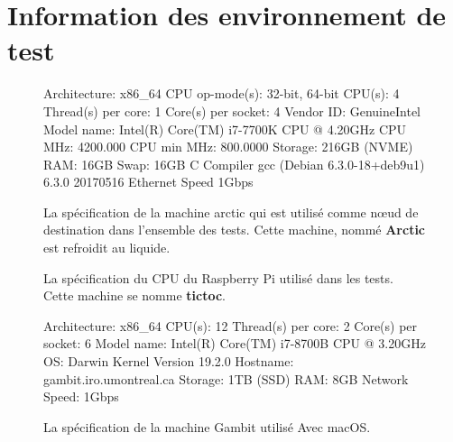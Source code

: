 \chapter{Information des environnement de test}
\label{ch:annexeA}

\begin{figure}[ht]
  \centering
\begin{mplisting}{1}
Architecture:          x86_64
CPU op-mode(s):        32-bit, 64-bit
CPU(s):                4
Thread(s) per core:    1
Core(s) per socket:    4
Vendor ID:             GenuineIntel
Model name:            Intel(R) Core(TM) i7-7700K CPU @ 4.20GHz
CPU MHz:               4200.000
CPU min MHz:           800.0000
Storage:               216GB (NVME)
RAM:                   16GB
Swap:                  16GB
C Compiler             gcc (Debian 6.3.0-18+deb9u1) 6.3.0 20170516
Ethernet Speed         1Gbps
\end{mplisting}
  \caption{La spécification de la machine arctic qui est utilisé comme nœud de destination dans
  l'ensemble des tests. Cette machine, nommé \textbf{Arctic} est refroidit au liquide.}
\end{figure}

\begin{figure}[h]
  \caption{La spécification du CPU du Raspberry Pi utilisé dans les tests.
  Cette machine se nomme \textbf{tictoc}.}
\end{figure}

\begin{figure}[h]
  \begin{mplisting}{1}
Architecture:        x86_64
CPU(s):              12
Thread(s) per core:  2
Core(s) per socket:  6
Model name:          Intel(R) Core(TM) i7-8700B CPU @ 3.20GHz
OS:                  Darwin Kernel Version 19.2.0
Hostname:            gambit.iro.umontreal.ca
Storage:             1TB (SSD)
RAM:                 8GB
Network Speed:       1Gbps
\end{mplisting}
  \caption{La spécification de la machine Gambit utilisé Avec macOS.}
\end{figure}
